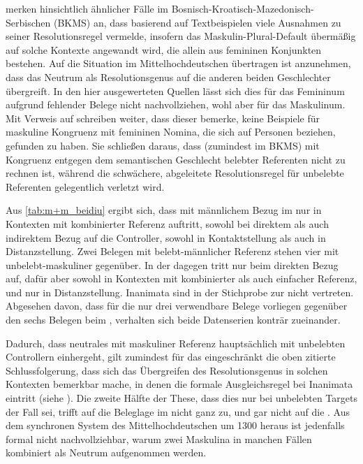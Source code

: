 \textcites[581]{wechsler2009}[190]{wechslerzlatic2003} merken hinsichtlich
ähnlicher Fälle im
Bosnisch-\allowbreak{}Kroatisch-\allowbreak{}Mazedonisch-\allowbreak{}Serbischen
(BKMS) an, dass \citet{corbett1983,corbett1991} basierend auf Textbeispielen
viele Ausnahmen zu seiner Resolutionsregel vermelde, insofern das
Maskulin-Plural-Default übermäßig auf solche Kontexte angewandt wird, die
allein aus femininen Konjunkten bestehen. Auf die Situation im
Mittelhochdeutschen übertragen ist anzunehmen, dass das Neutrum als
Resolutionsgenus auf die anderen beiden Geschlechter übergreift. In den hier
ausgewerteten Quellen lässt sich dies für das Femininum aufgrund fehlender
Belege nicht nachvollziehen, wohl aber für das Maskulinum. Mit Verweis auf
\citet[302]{corbett1991} schreiben
\textcites[581]{wechsler2009}[190]{wechslerzlatic2003} weiter, dass dieser
bemerke, keine Beispiele für maskuline Kongruenz mit femininen Nomina, die sich
auf Personen beziehen, gefunden zu haben. Sie schließen daraus, dass (zumindest
im BKMS) mit Kongruenz entgegen dem semantischen Geschlecht belebter Referenten
nicht zu rechnen ist, während die schwächere, abgeleitete Resolutionsregel für
unbelebte Referenten gelegentlich verletzt wird.

Aus \cref{tab:m+m_beidiu} ergibt sich, dass  mit männlichem Bezug
im \CAO{} nur in Kontexten mit kombinierter Referenz auftritt, sowohl
bei direktem als auch indirektem Bezug auf die Controller, sowohl in
Kontaktstellung als auch in Distanzstellung. Zwei Belegen mit belebt-männlicher
Referenz stehen vier mit unbelebt-maskuliner gegenüber. In der \citet{kc}
dagegen tritt  nur beim direkten Bezug auf, dafür aber sowohl in
Kontexten mit kombinierter als auch einfacher Referenz, und nur in
Distanzstellung. Inanimata sind in der Stichprobe zur \citet{kc} nicht
vertreten. Abgesehen davon, dass für die \citet{kc} nur drei verwendbare
Belege vorliegen gegenüber den sechs Belegen beim \CAO{}, verhalten
sich beide Datenserien konträr zueinander.

Dadurch, dass neutrales  mit maskuliner Referenz hauptsächlich mit
unbelebten Controllern einhergeht, gilt zumindest für das \CAO{}
eingeschränkt die oben zitierte Schlussfolgerung, dass sich das Übergreifen des
Resolutionsgenus in solchen Kontexten bemerkbar mache, in denen die formale
Ausgleichsregel bei Inanimata eintritt (siehe ). Die
zweite Hälfte der These, dass dies nur bei unbelebten Targets der Fall sei,
trifft auf die Beleglage im \CAO{} nicht ganz zu, und gar nicht auf
die \citet{kc}. Aus dem synchronen System des Mittelhochdeutschen um 1300
heraus ist jedenfalls formal nicht nachvollziehbar, warum zwei Maskulina in
manchen Fällen kombiniert als Neutrum aufgenommen werden.

